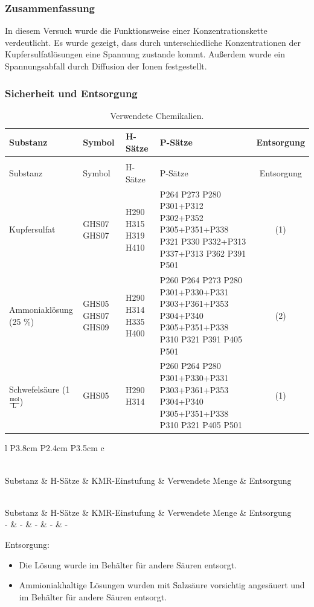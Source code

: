 \documentclass[
	a4paper,										%
	12pt,											%
	twoside,										%
	headsepline,								%
	footsepline,									%
	captions=tableheading,					%
]{scrartcl}
\newcommand{\langetabelle}[6]{  %
	\begin{centering}           %
		{\begin{longtable}[#3]{#4}
				\caption{#2\label{tab: #1}}\\				
				\hline
				#5
				\hline
				\endfirsthead
                \caption{#2\label{tab: #1}}\\
				\hline
				#5
				\hline
				\endhead
				#6												
				\hline 
		\end{longtable}}
\end{centering}}
\begin{document}

\subsubsection{Zusammenfassung}


In diesem Versuch wurde die Funktionsweise einer Konzentrationskette verdeutlicht.
Es wurde gezeigt, dass durch unterschiedliche Konzentrationen der Kupfersulfatlösungen eine Spannung zustande kommt. Außerdem wurde ein Spannungsabfall durch Diffusion der Ionen festgestellt.


\subsubsection{Sicherheit und Entsorgung}
		
\langetabelle
	{Chemikalien2}
	{Verwendete Chemikalien.}
	{H}  %
	{l p{1.4cm} p{2.2cm} p{4.5cm} c}
	{Substanz & Symbol & H-Sätze & P-Sätze & Entsorgung \\}
	{ Kupfersulfat & GHS07 GHS07 & H290 H315 H319 H410 & P264 P273 P280 P301+P312 P302+P352 P305+P351+P338 P321 P330 P332+P313 P337+P313
    P362 P391 P501 & (1) \\
    Ammoniaklösung (25 \%) & GHS05 GHS07 GHS09 & H290 H314 H335 H400 & P260 P264 P273 P280 P301+P330+P331 P303+P361+P353 P304+P340 P305+P351+P338
    P310 P321 P391 P405 P501 & (2) \\
    Schwefelsäure (1 $\mathrm{\frac{mol}{L}}$) & GHS05 & H290 H314 & P260 P264 P280 P301+P330+P331 P303+P361+P353 P304+P340 P305+P351+P338 P310
    P321 P405 P501  & (1) \\}

\langetabelle
	{KMR_leer2}
	{Verwendete kanzerogene, mutagene oder reproduktionstoxische Gefahrstoffe (KMR).}
	{H}
	{l P{3.8cm} P{2.4cm} P{3.5cm} c}
	{Substanz & H-Sätze & KMR-Einstufung & Verwendete Menge & Entsorgung \\}
	{ - & - & - & - & - \\}
	
Entsorgung: \\
\begin{itemize}
    \item[(1)] Die Lösung wurde im Behälter für andere Säuren entsorgt.
    \item[(2)] Ammioniakhaltige Lösungen wurden mit Salzsäure vorsichtig angesäuert und im Behälter für andere Säuren entsorgt.
\end{itemize}	
\end{document}
